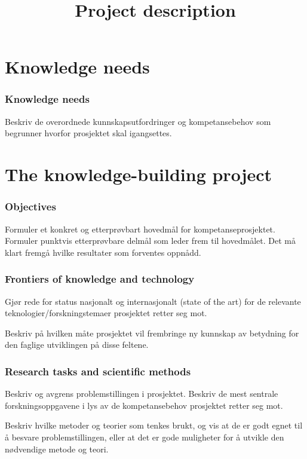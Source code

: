 \documentclass[11pt,a4paper,norsk]{article}
\title{Project description}
\begin{document}
\maketitle

\part{Knowledge needs}

\section{Knowledge needs}
Beskriv de overordnede kunnskapsutfordringer og kompetansebehov som begrunner hvorfor prosjektet skal igangsettes.

\part{The knowledge-building project}

\section{Objectives}
Formuler et konkret og etterprøvbart hovedmål for kompetanseprosjektet. Formuler punktvis etterprøvbare delmål som leder frem til hovedmålet. Det må klart fremgå hvilke resultater som forventes oppnådd.

\section{Frontiers of knowledge and technology}
Gjør rede for status nasjonalt og internasjonalt (state of the art) for de relevante teknologier/forskningstemaer prosjektet retter seg mot.

Beskriv på hvilken måte prosjektet vil frembringe ny kunnskap av betydning for den faglige utviklingen på disse feltene.

\section{Research tasks and scientific methods}
Beskriv og avgrens problemstillingen i prosjektet. Beskriv de mest sentrale forskningsoppgavene i lys av de kompetansebehov prosjektet retter seg mot.

Beskriv hvilke metoder og teorier som tenkes brukt, og vis at de er godt egnet til å besvare problemstillingen, eller at det er gode muligheter for å utvikle den nødvendige metode og teori.
\end{document}
